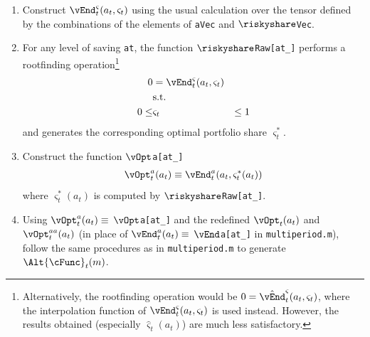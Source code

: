 \documentclass[titlepage]{\econtex}
\begin{document}
\begin{enumerate}

\item Construct
  $\vEnd_{t}^{\varsigma}({a}_{t},\varsigma_{t})$ using the usual calculation
  over the tensor defined by the combinations of the elements of
  \texttt{aVec} and \texttt{$\riskyshare$Vec}.

\item For any level of saving \texttt{at}, the function \texttt{$\riskyshare$Raw[at\_]} performs a rootfinding
  operation\footnote{Alternatively, the rootfinding operation would be
    $0 = \hat{\vEnd}^{\varsigma}_{t}({a}_{t},\varsigma_{t})$, where the
    interpolation function of $\vEnd_{t}^{\varsigma}({a}_{t},\varsigma_{t})$ is
    used instead. However, the results obtained (especially
    $\hat{\varsigma}_{t}({a}_{t})$) are much less satisfactory.}
  \begin{equation}\begin{gathered}\begin{aligned}
    0  & = \vEnd^{\varsigma}_{t}({a}_{t},\varsigma_{t})
    \\      & \text{s.t.} & \nonumber
    \\      0 \leq & \varsigma_{t} & \leq 1
  \end{aligned}\end{gathered}\end{equation}
  and generates the corresponding optimal portfolio share
  $\varsigma^{\ast}_{t}$.

\item Construct the function \texttt{$\vOpt$a[at\_]}
  \begin{equation}\begin{gathered}\begin{aligned}
    \vOpt_{t}^{a}({a}_{t}) \equiv
    \vEnd_{t}^{a}({a}_{t},\varsigma^{\ast}_{t}({a}_{t}))
  \end{aligned}\end{gathered}\end{equation}
  where $\varsigma^{\ast}_{t}({a}_{t})$ is computed by \texttt{$\riskyshare$Raw[at\_]}.

\item Using $\vOpt_{t}^{a}({a}_{t}) \equiv$
  \texttt{$\vOpt$a[at\_]} and the redefined
  $\vOpt_{t}({a}_{t})$ and $\vOpt_{t}^{{aa}}({a}_{t})$ (in
  place of $\vEnd_{t}^{a}({a}_{t}) \equiv $ \texttt{$\vEnd$a[at\_]} in
  \texttt{multiperiod.m}), follow the same procedures as in
  \texttt{multiperiod.m} to generate $\Alt{\cFunc}_{t}({m})$.

\end{enumerate}
\end{document}
